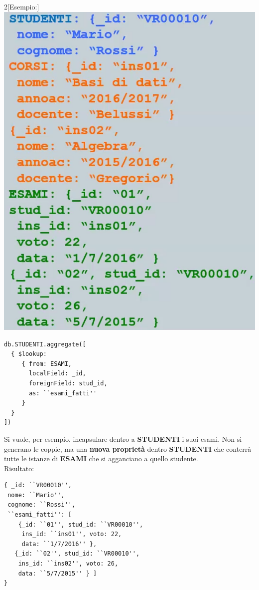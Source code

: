 \documentclass{report}
\begin{document}
\begin{multicols}{2}[Esempio:]
\includegraphics[scale=0.5]{document_store_example_2}
\newcolumn

\begin{lstlisting}
db.STUDENTI.aggregate([
  { $lookup:
	 { from: ESAMI,
	   localField: _id,
	   foreignField: stud_id,
	   as: ``esami_fatti''
	 }
  }
])
\end{lstlisting}

Si vuole, per esempio, incapsulare dentro a \color{blue}\textbf{STUDENTI} \color{black}i suoi esami. Non si generano le coppie, ma una \textbf{nuova propriet\`a} dentro \color{blue}\textbf{STUDENTI} \color{black}che conterr\`a tutte le istanze di \color{green}\textbf{ESAMI} \color{black} che si agganciano a quello studente.\\Risultato:

\begin{lstlisting}
{ _id: ``VR00010'',
 nome: ``Mario'',
 cognome: ``Rossi'',
 ``esami_fatti'': [
 	{_id: ``01'', stud_id: ``VR00010'',
 	 ins_id: ``ins01'', voto: 22, 
 	 data: ``1/7/2016'' },
   {_id: ``02'', stud_id: ``VR00010'', 
    ins_id: ``ins02'', voto: 26, 
    data: ``5/7/2015'' } ]
}
\end{lstlisting}


\end{multicols}
\end{document}
